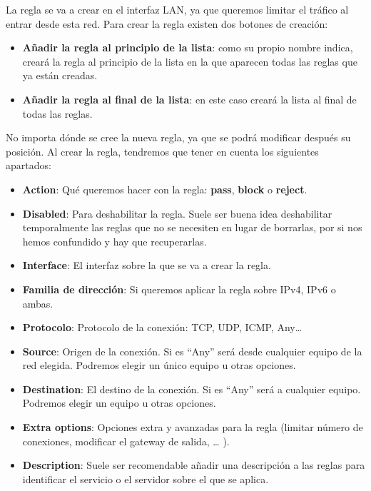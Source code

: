 La regla se va a crear en el interfaz LAN, ya que queremos limitar el tráfico al entrar desde esta red. Para crear la regla existen dos botones de creación:

\begin{itemize}
    \item \textbf{Añadir la regla al principio de la lista}: como su propio nombre indica, creará la regla al principio de la lista en la que aparecen todas las reglas que ya están creadas.
    \item \textbf{Añadir la regla al final de la lista}: en este caso creará la lista al final de todas las reglas.
\end{itemize}

No importa dónde se cree la nueva regla, ya que se podrá modificar después su posición. Al crear la regla, tendremos que tener en cuenta los siguientes apartados:

\begin{itemize}
    \item \textbf{Action}: Qué queremos hacer con la regla: \textbf{pass}, \textbf{block} o \textbf{reject}.
    \item \textbf{Disabled}: Para deshabilitar la regla. Suele ser buena idea deshabilitar temporalmente las reglas que no se necesiten en lugar de borrarlas, por si nos hemos confundido y hay que recuperarlas.
    \item \textbf{Interface}: El interfaz sobre la que se va a crear la regla.
    \item \textbf{Familia de dirección}: Si queremos aplicar la regla sobre IPv4, IPv6 o ambas.
    \item \textbf{Protocolo}: Protocolo de la conexión: TCP, UDP, ICMP, Any…
    \item \textbf{Source}: Origen de la conexión. Si es “Any” será desde cualquier equipo de la red elegida. Podremos elegir un único equipo u otras opciones.
    \item \textbf{Destination}: El destino de la conexión. Si es “Any” será a cualquier equipo. Podremos elegir un equipo u otras opciones.
    \item \textbf{Extra options}: Opciones extra y avanzadas para la regla (limitar número de conexiones, modificar el gateway de salida, … ).
    \item \textbf{Description}: Suele ser recomendable añadir una descripción a las reglas para identificar el servicio o el servidor sobre el que se aplica.
\end{itemize}


